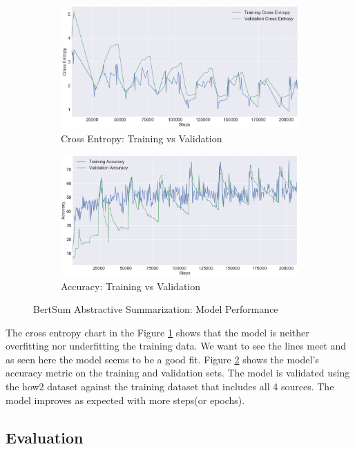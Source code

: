 \documentclass{article}
\begin{document}
\begin{figure}[H]
\begin{subfigure}{.6\textwidth}
  \centering
  \includegraphics[width=\linewidth]{xent.png}
  \caption{Cross Entropy: Training vs Validation}
  \label{fig:xent}
\end{subfigure}%
\begin{subfigure}{.6\textwidth}
  \centering
  \includegraphics[width=\linewidth]{accuracy.png}
  \caption{Accuracy: Training vs Validation}
  \label{fig:accuracy}
\end{subfigure}
\caption{BertSum Abstractive Summarization: Model Performance}
\label{fig:modelperf}
\end{figure}

The cross entropy chart  in the Figure \ref{fig:xent} shows that the model is neither overfitting nor underfitting the training data. We want to see the lines meet and as seen here the model seems to be a good fit. Figure \ref{fig:accuracy} shows the model’s accuracy metric on the training and validation sets. The model is validated using the how2 dataset against the training dataset that includes all 4 sources. The model improves as expected with more steps(or epochs). 

\subsection{Evaluation}
\end{document}
